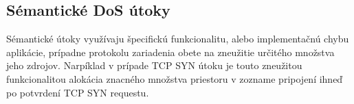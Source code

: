 \documentclass[
  printed, %
  table,   %
  lof,     %
  lot,     %
]{fithesis3}
\begin{document}
\subsection{Sémantické DoS útoky}
Sémantické útoky využívaju špecifickú funkcionalitu, alebo implementačnú chybu aplikácie, prípadne protokolu zariadenia obete na zneužitie určitého množstva jeho zdrojov. Narpíklad v prípade TCP SYN útoku je touto zneužitou funkcionalitou alokácia znacného množstva priestoru v zozname pripojení ihneď po potvrdení TCP SYN requestu.
\end{document}
